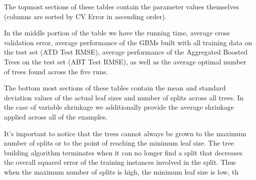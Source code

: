 \documentclass[9pt, conference]{IEEEtran}
\begin{document}
The topmost sections of these tables contain the parameter values themselves (columns are sorted by CV Error in ascending order). 

In the middle portion of the table we have the running time, average cross validation error, average performance of the GBMs built with all training data on the test set (ATD Test RMSE), average performance of the Aggregated Boosted Trees on the test set (ABT Test RMSE), as well as the average optimal number of trees found across the five runs. 

The bottom most sections of these tables contain the mean and standard deviation values of the actual leaf sizes and number of splits across all trees. In the case of variable shrinkage we additionally provide the average shrinkage applied across all of the examples. 

It's important to notice that the trees cannot always be grown to the maximum number of splits or to the point of reaching the minimum leaf size. The tree building algorithm terminates when it can no longer find a split that decreases the overall squared error of the training instances involved in the split. Thus when the maximum number of splits is high, the minimum leaf size is low, th
\end{document}
